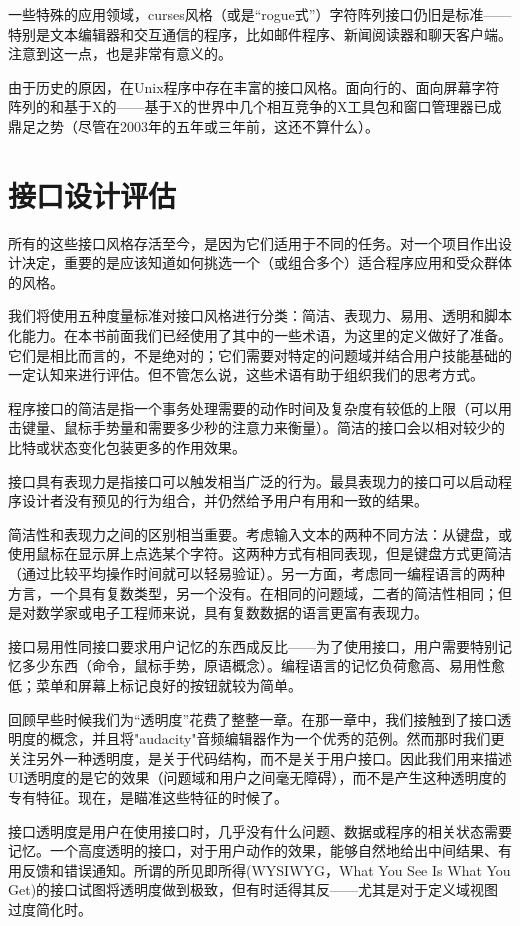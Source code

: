 \documentclass[12pt,oneside]{ctexbook}
\begin{document}
\begin{common-format}
一些特殊的应用领域，curses风格（或是“rogue式”）字符阵列接口仍旧是标准——特别是文本编辑器和交互通信的程序，比如邮件程序、新闻阅读器和聊天客户端。注意到这一点，也是非常有意义的。

由于历史的原因，在Unix程序中存在丰富的接口风格。面向行的、面向屏幕字符阵列的和基于X的——基于X的世界中几个相互竞争的X工具包和窗口管理器已成鼎足之势（尽管在2003年的五年或三年前，这还不算什么）。

\section{接口设计评估}
所有的这些接口风格存活至今，是因为它们适用于不同的任务。对一个项目作出设计决定，重要的是应该知道如何挑选一个（或组合多个）适合程序应用和受众群体的风格。

我们将使用五种度量标准对接口风格进行分类：简洁、表现力、易用、透明和脚本化能力。在本书前面我们已经使用了其中的一些术语，为这里的定义做好了准备。它们是相比而言的，不是绝对的；它们需要对特定的问题域并结合用户技能基础的一定认知来进行评估。但不管怎么说，这些术语有助于组织我们的思考方式。

程序接口的简洁是指一个事务处理需要的动作时间及复杂度有较低的上限（可以用击键量、鼠标手势量和需要多少秒的注意力来衡量）。简洁的接口会以相对较少的比特或状态变化包装更多的作用效果。

接口具有表现力是指接口可以触发相当广泛的行为。最具表现力的接口可以启动程序设计者没有预见的行为组合，并仍然给予用户有用和一致的结果。

简洁性和表现力之间的区别相当重要。考虑输入文本的两种不同方法：从键盘，或使用鼠标在显示屏上点选某个字符。这两种方式有相同表现，但是键盘方式更简洁（通过比较平均操作时间就可以轻易验证）。另一方面，考虑同一编程语言的两种方言，一个具有复数类型，另一个没有。在相同的问题域，二者的简洁性相同；但是对数学家或电子工程师来说，具有复数数据的语言更富有表现力。

接口易用性同接口要求用户记忆的东西成反比——为了使用接口，用户需要特别记忆多少东西（命令，鼠标手势，原语概念）。编程语言的记忆负荷愈高、易用性愈低；菜单和屏幕上标记良好的按钮就较为简单。

回顾早些时候我们为“透明度”花费了整整一章。在那一章中，我们接触到了接口透明度的概念，并且将"audacity"音频编辑器作为一个优秀的范例。然而那时我们更关注另外一种透明度，是关于代码结构，而不是关于用户接口。因此我们用来描述UI透明度的是它的效果（问题域和用户之间毫无障碍），而不是产生这种透明度的专有特征。现在，是瞄准这些特征的时候了。

接口透明度是用户在使用接口时，几乎没有什么问题、数据或程序的相关状态需要记忆。一个高度透明的接口，对于用户动作的效果，能够自然地给出中间结果、有用反馈和错误通知。所谓的所见即所得(WYSIWYG，What You See Is What You Get)的接口试图将透明度做到极致，但有时适得其反——尤其是对于定义域视图过度简化时。


\end{common-format}
\end{document}
